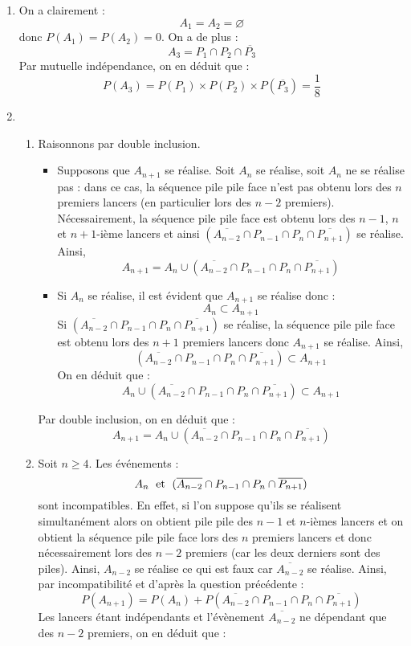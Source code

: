 \documentclass[a4paper,10pt]{report}
\begin{document}
\begin{enumerate}
\item On a clairement :
$$ A_1=A_2= \varnothing$$
donc $P(A_1)=P(A_2)=0$. On a de plus :
$$ A_3 = P_1 \cap P_2 \cap \overline{P_3}$$
Par mutuelle indépendance, on en déduit que :
$$ P(A_3) = P(P_1) \times P(P_2) \times P(\overline{P_3}) = \dfrac{1}{8}$$
\item 
\begin{enumerate}
\item Raisonnons par double inclusion.
\begin{itemize}
\item Supposons que $A_{n+1}$ se réalise. Soit $A_n$ se réalise, soit $A_n$ ne se réalise pas : dans ce cas, la séquence pile pile face n'est pas obtenu lors des $n$ premiers lancers (en particulier lors des $n-2$ premiers). Nécessairement, la séquence pile pile face est obtenu lors des $n-1$, $n$ et $n+1$-ième lancers et ainsi $(\overline{A_{n-2}} \cap P_{n-1} \cap P_n \cap \overline{P_{n+1}})$ se réalise. Ainsi,
$$ A_{n+1} = A_n  \cup (\overline{A_{n-2}} \cap P_{n-1} \cap P_n \cap \overline{P_{n+1}})$$
\item Si $A_n$ se réalise, il est évident que $A_{n+1}$ se réalise donc :
$$ A_n \subset A_{n+1}$$
Si $(\overline{A_{n-2}} \cap P_{n-1} \cap P_n \cap \overline{P_{n+1}})$ se réalise, la séquence pile pile face est obtenu lors des $n+1$ premiers lancers donc $A_{n+1}$ se réalise. Ainsi,
$$ (\overline{A_{n-2}} \cap P_{n-1} \cap P_n \cap \overline{P_{n+1}}) \subset A_{n+1}$$
On en déduit que :
$$ A_n \cup (\overline{A_{n-2}} \cap P_{n-1} \cap P_n \cap \overline{P_{n+1}})\subset A_{n+1}$$
\end{itemize}
Par double inclusion, on en déduit que :
$$A_{n+1} = A_n  \cup (\overline{A_{n-2}} \cap P_{n-1} \cap P_n \cap \overline{P_{n+1}})$$
\item Soit $n \geq 4$. Les événements :
$$  A_n  \; \hbox{ et } \;  (\overline{A_{n-2}} \cap P_{n-1} \cap P_n \cap \overline{P_{n+1}})$$
sont incompatibles. En effet, si l'on suppose qu'ils se réalisent simultanément alors on obtient pile pile des $n-1$ et $n$-ièmes lancers et on obtient la séquence pile pile face lors des $n$ premiers lancers et donc nécessairement lors des $n-2$ premiers (car les deux derniers sont des piles). Ainsi, $A_{n-2}$ se réalise ce qui est faux car $\overline{A_{n-2}}$ se réalise. Ainsi, par incompatibilité et d'après la question précédente :
$$ P(A_{n+1}) = P(A_n) +   P(\overline{A_{n-2}} \cap P_{n-1} \cap P_n \cap \overline{P_{n+1}})$$
Les lancers étant indépendants et l'évènement $\overline{A_{n-2}}$ ne dépendant que des $n-2$ premiers, on en déduit que :

\end{enumerate}
\end{enumerate}
\end{document}
